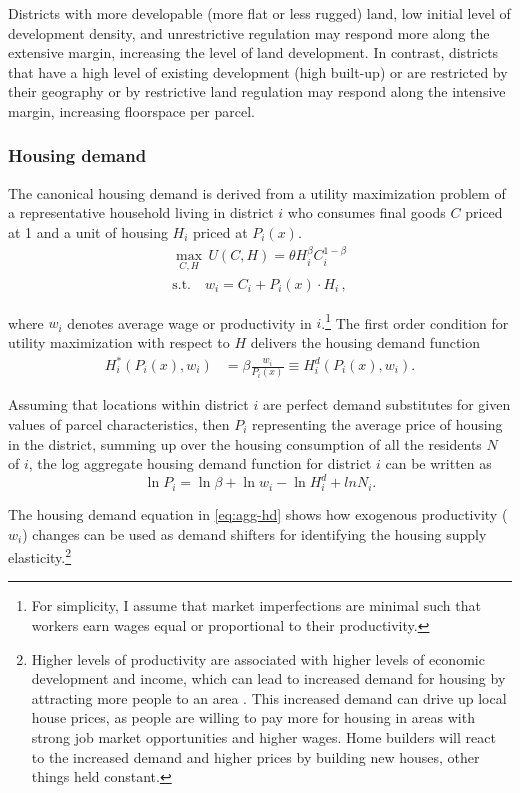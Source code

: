 \documentclass[
  12pt,
]{article}
\begin{document}
Districts with more developable (more flat or less rugged) land, low initial level of development density, and unrestrictive regulation may respond more along the extensive margin, increasing the level of land development. In contrast, districts that have a high level of existing development (high built-up) or are restricted by their geography or by restrictive land regulation may respond along the intensive margin, increasing floorspace per parcel.

\subsubsection{Housing demand}\label{housing-demand}

The canonical housing demand is derived from a utility maximization problem of a representative household living in district \(i\) who consumes final goods \(C\) priced at 1 and a unit of housing \(H_i\) priced at \(P_i(x)\).\[\begin{aligned}
\underset{C,H}{\max}\, U(C, H) = \theta H_i^\beta C_i^{1-\beta}\\
\text{s.t.}\quad w_i = C_i+P_i(x)\cdot H_i\,,
\end{aligned}\]

where \(w_i\) denotes average wage or productivity in \(i\).\footnote{For simplicity, I assume that market imperfections are minimal such that workers earn wages equal or proportional to their productivity.} The first order condition for utility maximization with respect to \(H\) delivers the housing demand function \[
\begin{aligned}
H^{*}_i(P_i(x), w_i) &= \beta\frac{w_i}{P_i(x)} \equiv H^d_i(P_i(x), w_i).
\end{aligned}
\]

Assuming that locations within district \(i\) are perfect demand substitutes for given values of parcel characteristics, then \(P_{i}\) representing the average price of housing in the district, summing up over the housing consumption of all the residents \(N\) of \(i\), the log aggregate housing demand function for district \(i\) can be written as \begin{equation}
\ln P_{i}=\ln \beta + \ln w_{i}-\ln H_{i}^{d} + ln N_{i} \label{eq:agg-hd}.
\end{equation}

The housing demand equation in \eqref{eq:agg-hd} shows how exogenous productivity (\(w_i\)) changes can be used as demand shifters for identifying the housing supply elasticity.\footnote{Higher levels of productivity are associated with higher levels of economic development and income, which can lead to increased demand for housing by attracting more people to an area \citep{glaesergottlieb2009, glaeser2008}. This increased demand can drive up local house prices, as people are willing to pay more for housing in areas with strong job market opportunities and higher wages. Home builders will react to the increased demand and higher prices by building new houses, other things held constant.}
\end{document}
